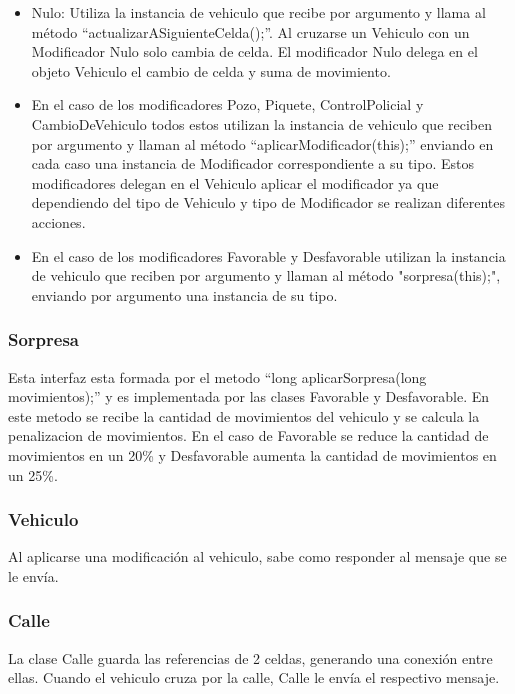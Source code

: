 \documentclass[titlepage,a4paper]{article}
\begin{document}
\begin{itemize}
  \item Nulo: Utiliza la instancia de vehiculo que recibe por argumento y llama al método “actualizarASiguienteCelda();”. Al cruzarse un Vehiculo con un Modificador Nulo solo cambia de celda. El modificador Nulo delega en el objeto Vehiculo el cambio de celda y suma de movimiento.
  \item En el caso de los modificadores Pozo, Piquete, ControlPolicial y CambioDeVehiculo todos estos utilizan la instancia de vehiculo que reciben por argumento y llaman al método “aplicarModificador(this);” enviando en cada caso una instancia de Modificador correspondiente a su tipo. Estos modificadores delegan en el Vehiculo aplicar el modificador ya que dependiendo del tipo de Vehiculo y tipo de Modificador se realizan diferentes acciones.
  \item En el caso de los modificadores Favorable y Desfavorable utilizan la instancia de vehiculo que reciben por argumento y llaman al método "sorpresa(this);", enviando por argumento una instancia de su tipo.
\end{itemize}
\subsubsection[Sorpresa]{Sorpresa}

Esta interfaz esta formada por el metodo  “long aplicarSorpresa(long movimientos);”  y es implementada por las clases Favorable y Desfavorable.
En este metodo se recibe la cantidad de movimientos del vehiculo y se calcula la penalizacion de movimientos. En el caso de Favorable se reduce la cantidad de movimientos en un 20\% y Desfavorable aumenta la cantidad de movimientos en un 25\%.

\subsubsection[Vehiculo]{Vehiculo}

Al aplicarse una modificación al vehiculo, sabe como responder al mensaje que se le envía.


\subsubsection[Calle]{Calle}

La clase Calle guarda las referencias de 2 celdas, generando una conexión entre ellas. Cuando el vehiculo cruza por la calle, Calle le envía el respectivo mensaje.
\end{document}
